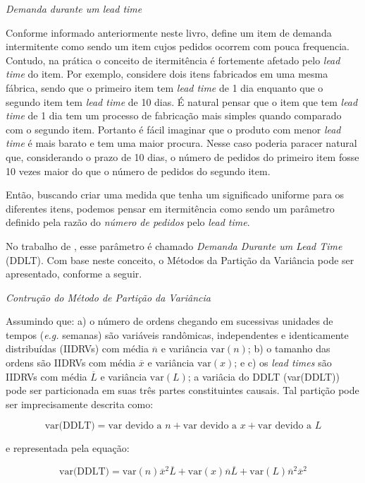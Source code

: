\documentclass{book}
\begin{document}
\emph{Demanda durante um lead time}

Conforme informado anteriormente neste livro, \cite{BoylanEtAl2008} define um item de demanda intermitente como sendo um item cujos pedidos ocorrem com pouca frequencia. Contudo, na prática o conceito de itermitência é fortemente afetado pelo \emph{lead time} do item. Por exemplo, considere dois itens fabricados em uma mesma fábrica, sendo que o primeiro item tem \emph{lead time} de 1 dia enquanto que o segundo item tem \emph{lead time} de 10 dias. É natural pensar que o item que tem \emph{lead time} de 1 dia tem um processo de fabricação mais simples quando comparado com o segundo item. Portanto é fácil imaginar que o produto com menor \emph{lead time} é mais barato e tem uma maior procura. Nesse caso poderia paracer natural que, considerando o prazo de 10 dias, o número de pedidos do primeiro item fosse 10 vezes maior do que o número de pedidos do segundo item. 

Então, buscando criar uma medida que tenha um significado uniforme para os diferentes itens, podemos pensar em itermitência como sendo um parâmetro definido pela razão do \emph{número de pedidos} pelo \emph{lead time}.   

No trabalho de \cite{Williams1984}, esse parâmetro é chamado \emph{Demanda Durante um Lead Time} (DDLT). Com base neste conceito, o Métodos da Partição da Variância pode ser apresentado, conforme a seguir.

\emph{Contrução do Método de Partição da Variância}

Assumindo que: a) o número de ordens chegando em sucessivas unidades de tempos (\emph{e.g.} semanas) são variáveis randômicas, independentes e identicamente distribuídas (IIDRVs) com média $\overline{n}$ e variância $\textrm{var}(n)$; b) o tamanho das ordens são IIDRVs com média $\overline{x}$ e variância $\textrm{var}(x)$; e c) os \emph{lead times} são IIDRVs com média $\overline{L}$ e variância $\textrm{var}(L)$; a variâcia do DDLT (\textrm{var(DDLT)}) pode ser particionada em suas três partes constituintes causais. Tal partição pode ser imprecisamente descrita como:

\begin{equation}
\textrm{var(DDLT)} = \textrm{var devido a } n + \textrm{var devido a } x + \textrm{var devido a } L
\end{equation}

e representada pela equação:

\begin{equation}
\textrm{var(DDLT)} = \textrm{var}(n) \overline{x}^2 \overline{L}   + \textrm{var}(x) \overline{n} \overline{L} + \textrm{var}(L) \overline{n}^2 \overline{x}^2
\end{equation}
\end{document}
